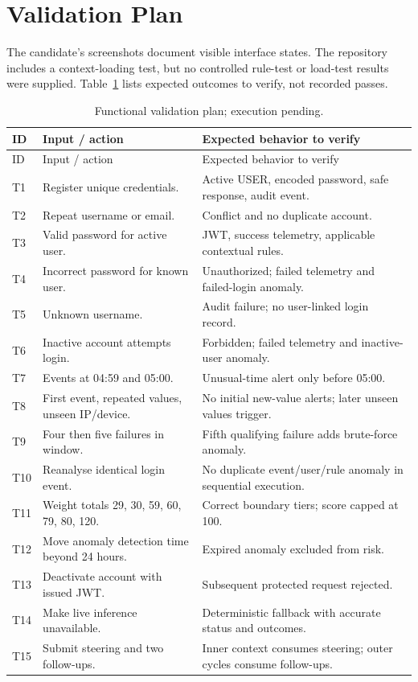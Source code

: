 \clearpage\section{Validation Plan}
The candidate's screenshots document visible interface states. The repository includes a context-loading test, but no controlled rule-test or load-test results were supplied. Table~\ref{tab:tests} lists expected outcomes to verify, not recorded passes.
\begingroup\footnotesize{}\renewcommand{\arraystretch}{1.1}\setlength{\parskip}{0pt}
\begin{longtable}{>{\raggedright\arraybackslash}p{0.9cm}>{\raggedright\arraybackslash}p{6.1cm}>{\raggedright\arraybackslash}p{7cm}}
\caption{Functional validation plan; execution pending.}\label{tab:tests}\\\toprule ID & Input / action & Expected behavior to verify\\\midrule\endfirsthead
\toprule ID & Input / action & Expected behavior to verify\\\midrule\endhead
T1 & Register unique credentials. & Active USER, encoded password, safe response, audit event.\\
T2 & Repeat username or email. & Conflict and no duplicate account.\\
T3 & Valid password for active user. & JWT, success telemetry, applicable contextual rules.\\
T4 & Incorrect password for known user. & Unauthorized; failed telemetry and failed-login anomaly.\\
T5 & Unknown username. & Audit failure; no user-linked login record.\\
T6 & Inactive account attempts login. & Forbidden; failed telemetry and inactive-user anomaly.\\
T7 & Events at 04:59 and 05:00. & Unusual-time alert only before 05:00.\\
T8 & First event, repeated values, unseen IP/device. & No initial new-value alerts; later unseen values trigger.\\
T9 & Four then five failures in window. & Fifth qualifying failure adds brute-force anomaly.\\
T10 & Reanalyse identical login event. & No duplicate event/user/rule anomaly in sequential execution.\\
T11 & Weight totals 29, 30, 59, 60, 79, 80, 120. & Correct boundary tiers; score capped at 100.\\
T12 & Move anomaly detection time beyond 24 hours. & Expired anomaly excluded from risk.\\
T13 & Deactivate account with issued JWT. & Subsequent protected request rejected.\\
T14 & Make live inference unavailable. & Deterministic fallback with accurate status and outcomes.\\
T15 & Submit steering and two follow-ups. & Inner context consumes steering; outer cycles consume follow-ups.\\\bottomrule
\end{longtable}
\endgroup

